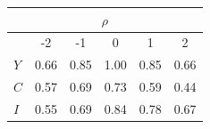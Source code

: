 \begin{table}[ht]
\centering
\begin{tabular}{lccccc}
\hline
\multicolumn{6}{c}{$\rho$} \\
\hline
& -2 & -1 & 0 & 1 & 2 \\
\hline
$Y$ & 0.66 & 0.85 & 1.00 & 0.85 & 0.66 \\
$C$ & 0.57 & 0.69 & 0.73 & 0.59 & 0.44 \\
$I$ & 0.55 & 0.69 & 0.84 & 0.78 & 0.67 \\
\hline
\end{tabular}
\end{table}